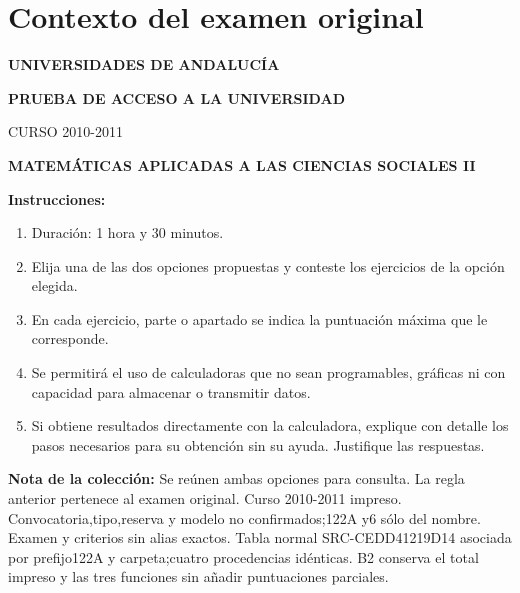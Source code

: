 \section*{Contexto del examen original}
\textbf{UNIVERSIDADES DE ANDALUCÍA}\par
\textbf{PRUEBA DE ACCESO A LA UNIVERSIDAD}\par
CURSO 2010-2011\par
\textbf{MATEMÁTICAS APLICADAS A LAS CIENCIAS SOCIALES II}

\textbf{Instrucciones:}
\begin{enumerate}[label=\textbf{\alph*)}]
  \item Duración: 1 hora y 30 minutos.
  \item Elija una de las dos opciones propuestas y conteste los ejercicios de la opción elegida.
  \item En cada ejercicio, parte o apartado se indica la puntuación máxima que le corresponde.
  \item Se permitirá el uso de calculadoras que no sean programables, gráficas ni con capacidad para almacenar o transmitir datos.
  \item Si obtiene resultados directamente con la calculadora, explique con detalle los pasos necesarios para su obtención sin su ayuda. Justifique las respuestas.
\end{enumerate}
\noindent\textbf{Nota de la colección:} Se reúnen ambas opciones para consulta. La regla anterior pertenece al examen original. Curso 2010-2011 impreso. Convocatoria,tipo,reserva y modelo no confirmados;122A y6 sólo del nombre. Examen y criterios sin alias exactos. Tabla normal SRC-CEDD41219D14 asociada por prefijo122A y carpeta;cuatro procedencias idénticas. B2 conserva el total impreso y las tres funciones sin añadir puntuaciones parciales.
\par\medskip

